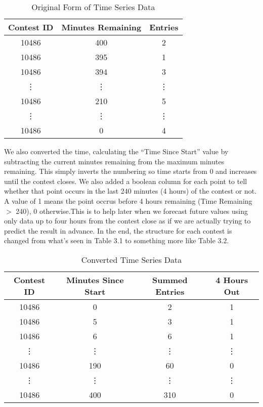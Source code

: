 \begin{table}
\begin{center}
\begin{tabular}{| c | c | c |}
\hline
 \textbf{Contest ID} & \textbf{Minutes Remaining} & \textbf{Entries} \\ 
 \hline
 10486 & 400 & 2 \\  
 \hline
 10486 & 395 & 1 \\
 \hline
 10486 & 394 & 3 \\
 \hline
 \vdots & \vdots & \vdots \\
 \hline
 10486 & 210 & 5 \\
 \hline
 \vdots & \vdots & \vdots \\
 \hline
 10486 & 0 & 4 \\
 \hline
\end{tabular}
\caption{Original Form of Time Series Data}
\end{center}
\end{table}

We also converted the time, calculating the ``Time Since Start'' value by subtracting the current minutes remaining from the maximum minutes remaining. This simply inverts the numbering so time starts from 0 and increases until the contest closes. We also added a boolean column for each point to tell whether that point occurs in the last 240 minutes (4 hours) of the contest or not. A value of 1 means the point occrus before 4 hours remaining (Time Remaining $>$ 240), 0 otherwise.This is to help later when we forecast future values using only data up to four hours from the contest close as if we are actually trying to predict the result in advance. In the end, the structure for each contest is changed from what's seen in Table 3.1 to something more like Table 3.2.

\begin{table}
\begin{center}
\begin{tabular}{| c | c | c | c |}
\hline
 \textbf{Contest ID} & \textbf{Minutes Since Start} & \textbf{Summed Entries} & \textbf{4 Hours Out} \\ 
 \hline
 10486 & 0 & 2 & 1 \\  
 \hline
 10486 & 5 & 3 & 1 \\
 \hline
 10486 & 6 & 6 & 1 \\
 \hline
 \vdots & \vdots & \vdots & \vdots \\
 \hline
 10486 & 190 & 60 & 0 \\
 \hline
 \vdots & \vdots & \vdots & \vdots \\
 \hline
 10486 & 400 & 310 & 0 \\
 \hline
\end{tabular}
\caption{Converted Time Series Data}
\end{center}
\end{table}

